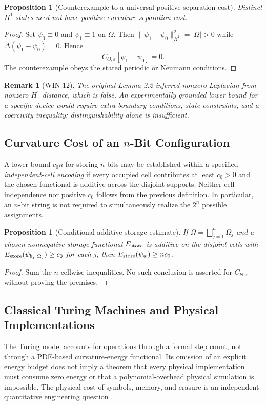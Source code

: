 \documentclass[11pt,a4paper]{article}
\newtheorem{proposition}[theorem]{Proposition}
\newtheorem{remark}[theorem]{Remark}
\newcommand{\CTheta}{C_{\Theta,\varepsilon}}
\begin{document}
\begin{proposition}[Counterexample to a universal positive separation cost]
\label{prop:zero_cost}
Distinct $H^1$ states need not have positive curvature-separation cost.
\end{proposition}
\begin{proof}
Set $\psi_0\equiv0$ and $\psi_1\equiv1$ on $\Omega$. Then
$\|\psi_1-\psi_0\|_{H^1}^2=|\Omega|>0$ while
$\Delta(\psi_1-\psi_0)=0$. Hence
\[
\CTheta[\psi_1-\psi_0]=0.
\]
The counterexample obeys the stated periodic or Neumann conditions.
\end{proof}

\begin{remark}[WIN-12]
The original Lemma 2.2 inferred nonzero Laplacian from nonzero $H^1$
distance, which is false. An experimentally grounded lower bound for a
specific device would require extra boundary conditions, state constraints,
and a coercivity inequality; distinguishability alone is insufficient.
\end{remark}

\subsection{Curvature Cost of an \texorpdfstring{$n$}{n}-Bit Configuration}
A lower bound $c_0n$ for storing $n$ bits may be established within a
specified \emph{independent-cell encoding} if every occupied cell contributes
at least $c_0>0$ and the chosen functional is additive across the disjoint
supports. Neither cell independence nor positive $c_0$ follows from the
previous definition. In particular, an $n$-bit string is not required to
simultaneously realize the $2^n$ possible assignments.

\begin{proposition}[Conditional additive storage estimate]
If $\Omega=\bigsqcup_{j=1}^n\Omega_j$ and a chosen nonnegative storage
functional $E_{\rm store}$ is additive on the disjoint cells with
$E_{\rm store}(\psi_{b_j}|_{\Omega_j})\ge c_0$ for each $j$, then
$E_{\rm store}(\psi_w)\ge nc_0$.
\end{proposition}
\begin{proof}
Sum the $n$ cellwise inequalities. No such conclusion is asserted for
$\CTheta$ without proving the premises.
\end{proof}

\subsection{Classical Turing Machines and Physical Implementations}
The Turing model accounts for operations through a formal step count, not
through a PDE-based curvature-energy functional. Its omission of an
explicit energy budget does not imply a theorem that every physical
implementation must consume zero energy or that a polynomial-overhead
physical simulation is impossible. The physical cost of symbols, memory,
and erasure is an independent quantitative engineering question
\cite{Landauer1961,Bennett1982}.
\end{document}
